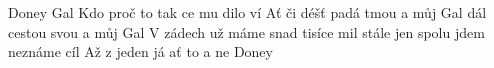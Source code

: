 \begin{TEXT}{Doney Gal}
\SLOKA Kdo  proč to  tak ce  \NL
{} mu dilo ví  
\REFREN  Ať  či déšť padá tmou \NL
{} a můj  Gal   \NL
{} dál cestou svou \NL
{} a můj  Gal   
\SLOKA V zádech už máme snad tisíce mil \NL
stále jen spolu jdem neznáme cíl 
\SLOKA Až z  jeden    \NL
já ať to  a ne  Doney  \NL
\end{TEXT}
